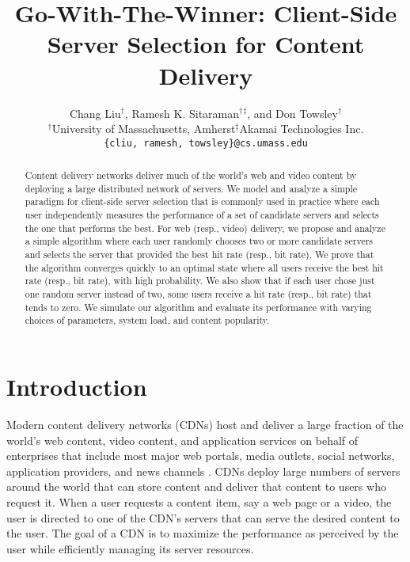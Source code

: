 \documentclass[conference]{IEEEtran}
\begin{document}
\title{Go-With-The-Winner: Client-Side Server Selection for Content Delivery}

\author{Chang Liu$^\dag$, Ramesh K. Sitaraman$^\dag$$^\ddag$, and Don Towsley$^\dag$\\
$^\dag$University of Massachusetts, Amherst\hspace{0.2in}$^\ddag$Akamai Technologies Inc.\\
\texttt{\{cliu, ramesh, towsley\}@cs.umass.edu}}



\maketitle

\begin{abstract}
Content delivery networks deliver much of the world's web and video content by deploying a large distributed network of servers. We model and analyze a simple paradigm for client-side server selection that is commonly used in practice  where each user independently measures the performance of a set of candidate servers and selects the one that performs the best. For web (resp., video) delivery, we propose and analyze a simple algorithm where each user randomly chooses two or more candidate servers and selects the server that provided the best hit rate (resp., bit rate). We prove that the algorithm converges quickly to an optimal state where all users receive the best hit rate (resp., bit rate), with high probability. We also show that if each user chose just one random server instead of two,  some users receive a hit rate (resp., bit rate) that tends to zero. We simulate our algorithm and evaluate its performance with varying choices of parameters, system load, and content popularity. 
\end{abstract}

\section{Introduction}
Modern content delivery networks (CDNs) host and deliver a large fraction of  the world's  web content, video content, and application services on behalf of enterprises that include most major web portals, media outlets, social networks, application providers, and news channels \cite{nygren2010akamai}.  CDNs deploy large numbers of servers around the world that can store content and deliver that content to users who request it. When a user requests  a content item, say a web page or a video,  the user is directed to one of  the CDN's servers that can serve the desired content to the user. The goal of a CDN is to maximize the performance as perceived by the user while efficiently managing its server resources.  
\end{document}
